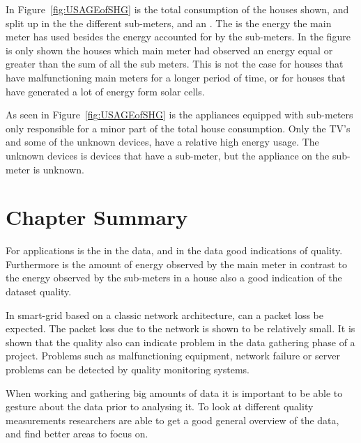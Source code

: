 In Figure~\ref{fig:USAGEofSHG} is the total consumption of the houses shown, and split up in the the different sub-meters, and an . The  is the energy the main meter has used besides the energy accounted for by the sub-meters. In the figure is only shown the houses which main meter had observed an energy equal or greater than the sum of all the sub meters. This is not the case for houses that have malfunctioning main meters for a longer period of time, or for houses that have generated a lot of energy form solar cells. 

As seen in Figure~\ref{fig:USAGEofSHG} is the appliances equipped with sub-meters only responsible for a minor part of the total house consumption. Only the TV's and some of the unknown devices, have a relative high energy usage. The unknown devices is devices that have a sub-meter, but the appliance on the sub-meter is unknown.  

\newpage

\section{Chapter Summary}
For  applications is the  in the data, and  in the data good indications of quality. Furthermore is the amount of energy observed by the main meter in contrast to the energy observed by the sub-meters in a house also a good indication of the dataset quality. 

In smart-grid based on a classic  network architecture, can a packet loss be expected. The packet loss due to the network is shown to be relatively small. It is shown that the quality also can indicate problem in the data gathering phase of a project. Problems such as malfunctioning equipment, network failure or server problems can be detected by quality monitoring systems.  

When working and gathering big amounts of data it is important to be able to gesture about the data prior to analysing it. To look at different quality measurements researchers are able to get a good general overview of the data, and find better areas to focus on.
